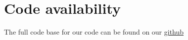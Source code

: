 \section{Code availability}

The full code base for our code can be found on our \href{https://github.com/Jafagervik/Judas}{github}